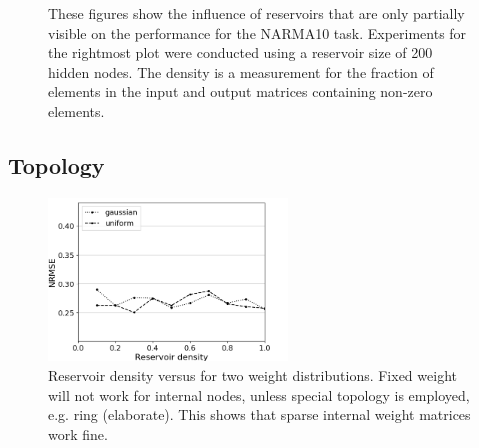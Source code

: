 \begin{figure}[htbp]
\begin{subfigure}{.3\textwidth}
  \end{subfigure}
  \caption{
    These figures show the influence of reservoirs that are only partially
visible on the performance for the NARMA10 task. Experiments for the rightmost
plot were conducted using a reservoir size of 200 hidden nodes. The density is a
measurement for the fraction of elements in the input and output matrices
containing non-zero elements.
  }
  \label{partial_visibility}
\end{figure}


\subsection{Topology}

\begin{figure}[H]
  \centering
  \includegraphics[width=2.5in]{img/reservoir_density_distrib.png}
  \caption{
    Reservoir density versus for two weight distributions. Fixed weight will not
work for internal nodes, unless special topology is employed, e.g. ring
(elaborate). This shows that sparse internal weight matrices work fine.
  }
  \label{reservoir_density_distrib}
\end{figure}


